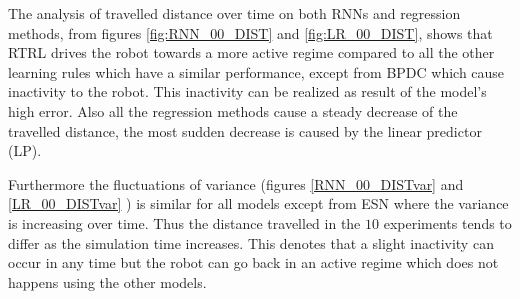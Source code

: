 \documentclass[msc,ai,logo]{infthesis}
\begin{document}
The analysis of travelled distance over time on both RNNs and regression methods, from figures \ref{fig:RNN_00_DIST} and \ref{fig:LR_00_DIST}, shows that RTRL drives the robot towards a more active regime compared to all the other learning rules which have a similar performance, except from BPDC which cause inactivity to the robot. This inactivity can be realized as result of the model's high error. Also all the regression methods cause a steady decrease of the travelled distance, the most sudden decrease is caused by the linear predictor (LP).

Furthermore the fluctuations of variance (figures \ref{RNN_00_DISTvar} and \ref{LR_00_DISTvar} ) is similar for all models except from ESN where the variance is increasing over time. Thus the distance travelled  in the $10$ experiments tends to differ as the simulation time increases. This denotes that a slight inactivity can occur in any time but the robot can go back in an active regime which does not happens using the other models.
\end{document}
